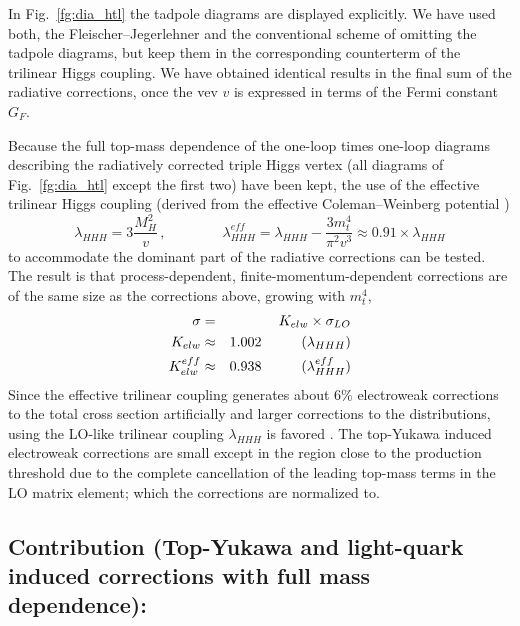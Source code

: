 In Fig.~\ref{fg:dia_htl} the tadpole diagrams are displayed explicitly. We have used both, the Fleischer--Jegerlehner and the conventional scheme of omitting the tadpole diagrams, but keep them in the corresponding counterterm of the trilinear Higgs coupling. We have obtained identical results in the final sum of the radiative corrections, once the vev $v$ is expressed in terms of the Fermi constant $G_F$.

Because the full top-mass dependence of the one-loop times one-loop diagrams describing the radiatively corrected triple Higgs vertex (all diagrams of Fig.~\ref{fg:dia_htl} except the first two) have been kept, the use of the effective trilinear Higgs coupling (derived from the effective Coleman--Weinberg potential \cite{Coleman:1973jx,Weinberg:1973ua,Jackiw:1974cv})
\begin{equation}
\lambda_{HHH} = 3 \frac{M_H^2}{v} \, , \qquad\qquad \lambda_{HHH}^{eff} = \lambda_{HHH} - \frac{3 m_t^4}{\pi^2 v^3} \approx 0.91 \times \lambda_{HHH}
\end{equation}
to accommodate the dominant part of the radiative corrections can be tested. The result is that process-dependent, finite-momentum-dependent corrections are of the same size as the corrections above, growing with $m_t^4$,
\begin{eqnarray}
\sigma & = & K_{elw} \times \sigma_{LO} \nonumber \\
K_{elw} & \approx & 1.002 \hspace*{1.0cm} \mbox{($\lambda_{HHH}$)} \nonumber \\
K^{eff}_{elw} & \approx & 0.938 \hspace*{1cm} \mbox{($\lambda^{eff}_{HHH}$)}
\end{eqnarray}
Since the effective trilinear coupling generates about 6\% electroweak corrections to the total cross section artificially and larger corrections to the distributions, using the LO-like trilinear coupling $\lambda_{HHH}$ is favored \cite{Muhlleitner:2022ijf}. The top-Yukawa induced electroweak corrections are small except in the region close to the production threshold due to the complete cancellation of the leading top-mass terms in the LO matrix element; which the corrections are normalized to.

\subsection{Contribution (Top-Yukawa and light-quark induced corrections with full mass dependence):}

